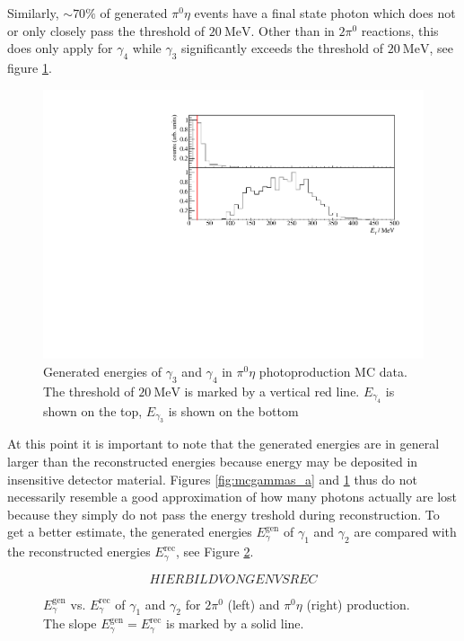  Similarly, $\sim70\%$ of generated $\pi^0\eta$ events have a final state photon which does not or only closely pass the threshold of $\SI{20}{\mega\eV}$. Other than in $2\pi^0$ reactions, this does only apply for $\gamma_4$ while $\gamma_3$ significantly exceeds the threshold of $\SI{20}{\mega\eV}$, see figure \ref{fig:mcgammas_b}. 
 \begin{figure}[htbp]
 	\centering
 	\includegraphics[width=\linewidth]{../figs/hydrogen/mcgammas_pi0eta.pdf}
 	\caption{Generated energies of $\gamma_3$ and $\gamma_4$ in $\pi^0\eta$ photoproduction MC data. The threshold of $\SI{20}{\mega\eV}$ is marked by a vertical red line. $E_{\gamma_4}$ is shown on the top, $E_{\gamma_3}$ is shown on the bottom}
 	\label{fig:mcgammas_b}			
 \end{figure}
 At this point it is important to note that the generated energies are in general larger than the reconstructed energies because energy may be deposited in insensitive detector material. Figures \ref{fig:mcgammas_a} and \ref{fig:mcgammas_b} thus do not necessarily resemble a good approximation of how many photons actually are lost because they simply do not pass the energy treshold during reconstruction. To get a better estimate, the generated energies $E_\gamma^\text{gen}$ of $\gamma_1$ and $\gamma_2$ are compared with the reconstructed energies $E_\gamma^\text{rec}$, see Figure \ref{fig:mcgenvsrec}. 
  \begin{figure}
 	$$HIERBILDVONGENVSREC$$
 	\caption{$E_\gamma^\text{gen}$ vs. $E_\gamma^\text{rec}$ of $\gamma_1$ and $\gamma_2$ for $2\pi^0$ (left) and $\pi^0\eta$ (right) production. The slope $E_\gamma^\text{gen}=E_\gamma^\text{rec}$ is marked by a solid line.}
 	\label{fig:mcgenvsrec}
 \end{figure}
